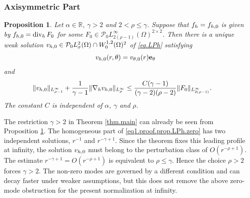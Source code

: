 \documentclass[11pt,a4paper]{article}
\numberwithin{equation}{section}
\newtheorem{proposition}[theorem]{Proposition}
{\theorembodyfont{\rmfamily}\newtheorem{remark}[theorem]{Remark}}
{\theorembodyfont{\rmfamily}\newtheorem{remarks}[theorem]{Remarks}}
\newcommand{\R}{\mathbb{R}}
\newcommand{\opdiv}{\operatorname{div}}
\newcommand{\h}{{\rm h}}
\begin{document}
\subsubsection{Axisymmetric Part}
\label{subsubsec.axisym.horiz}


%
\begin{proposition}\label{prop.LPh.zero}
Let $\alpha\in\R$, $\gamma>2$ and $2<\rho\le\gamma$. Suppose that $f_\h=f_{\h,0}$ is given by $f_{\h,0}=\opdiv_\h F_0$ for some $F_0\in {\mathcal P}_0 L^\infty_{2(\rho-1)}(\Omega)^{2\times2}$. Then there is a unique weak solution $v_{\h,0}\in {\mathcal P}_0 L^2_\sigma(\Omega) \cap W^{1,2}_0(\Omega)^2$ of \eqref{eq.LPh} satisfying 
\[
v_{\h,0}(r,\theta)=v_{\theta,0}(r) {\bf e}_\theta
\]
and 
%
\begin{align}\label{est1.prop.LPh.zero}
\|v_{\h,0}\|_{L^\infty_{\rho-1}} 
+ \frac{1}{\gamma-1} 
\|\nabla_\h v_{\h,0}\|_{L^\infty_{\rho}} 
&\le 
\frac{C(\gamma-1)}{(\gamma-2)(\rho-2)} 
\|F_0\|_{L^\infty_{2(\rho-1)}}. 
\end{align}
%
The constant $C$ is independent of $\alpha$, $\gamma$ and $\rho$.
\end{proposition}
%


%
\begin{remark}\label{rem.zero.mode.gamma}
The restriction $\gamma>2$ in Theorem \ref{thm.main} can already be seen from Proposition \ref{prop.LPh.zero}. The homogeneous part of \eqref{eq1.proof.prop.LPh.zero} has two independent solutions, $r^{-1}$ and $r^{-\gamma+1}$. Since the theorem fixes this leading profile at infinity, the solution $v_{\h,0}$ must belong to the perturbation class of $O(r^{-\rho+1})$. The estimate $r^{-\gamma+1}=O(r^{-\rho+1})$ is equivalent to $\rho\le\gamma$. Hence the choice $\rho>2$ forces $\gamma>2$. The non-zero modes are governed by a different condition and can decay faster under weaker assumptions, but this does not remove the above zero-mode obstruction for the present normalization at infinity.
\end{remark}
%
\end{document}
